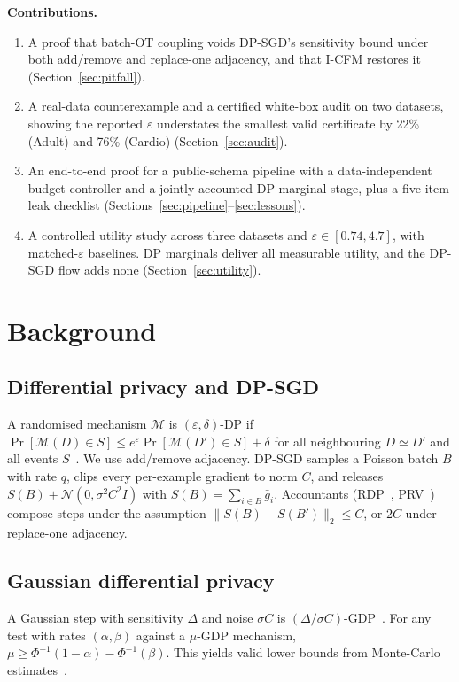 \documentclass[journal]{IEEEtran}
\newcommand{\eps}{\varepsilon}
\begin{document}
\textbf{Contributions.}
\begin{enumerate}
\item A proof that batch-OT coupling voids DP-SGD's sensitivity bound under both add/remove and replace-one adjacency, and that I-CFM restores it (Section~\ref{sec:pitfall}).
\item A real-data counterexample and a certified white-box audit on two datasets, showing the reported $\eps$ understates the smallest valid certificate by 22\% (Adult) and 76\% (Cardio) (Section~\ref{sec:audit}).
\item An end-to-end proof for a public-schema pipeline with a data-independent budget controller and a jointly accounted DP marginal stage, plus a five-item leak checklist (Sections~\ref{sec:pipeline}--\ref{sec:lessons}).
\item A controlled utility study across three datasets and $\eps\in[0.74,4.7]$, with matched-$\eps$ baselines. DP marginals deliver all measurable utility, and the DP-SGD flow adds none (Section~\ref{sec:utility}).
\end{enumerate}

\section{Background}
\subsection{Differential privacy and DP-SGD}
A randomised mechanism $\mathcal M$ is $(\eps,\delta)$-DP if $\Pr[\mathcal M(D)\in S]\le e^\eps\Pr[\mathcal M(D')\in S]+\delta$ for all neighbouring $D\simeq D'$ and all events $S$~\cite{dwork2006calibrating}. We use add/remove adjacency. DP-SGD samples a Poisson batch $B$ with rate $q$, clips every per-example gradient to norm $C$, and releases $S(B)+\mathcal N(0,\sigma^2C^2I)$ with $S(B)=\sum_{i\in B}\bar g_i$. Accountants (RDP~\cite{mironov2017renyi}, PRV~\cite{gopi2021numerical}) compose steps under the assumption $\|S(B)-S(B')\|_2\le C$, or $2C$ under replace-one adjacency.

\subsection{Gaussian differential privacy}
A Gaussian step with sensitivity $\Delta$ and noise $\sigma C$ is $(\Delta/\sigma C)$-GDP~\cite{dong2022gaussian}. For any test with rates $(\alpha,\beta)$ against a $\mu$-GDP mechanism, $\mu\ge\Phi^{-1}(1-\alpha)-\Phi^{-1}(\beta)$. This yields valid lower bounds from Monte-Carlo estimates~\cite{nasr2023tight}.
\end{document}

